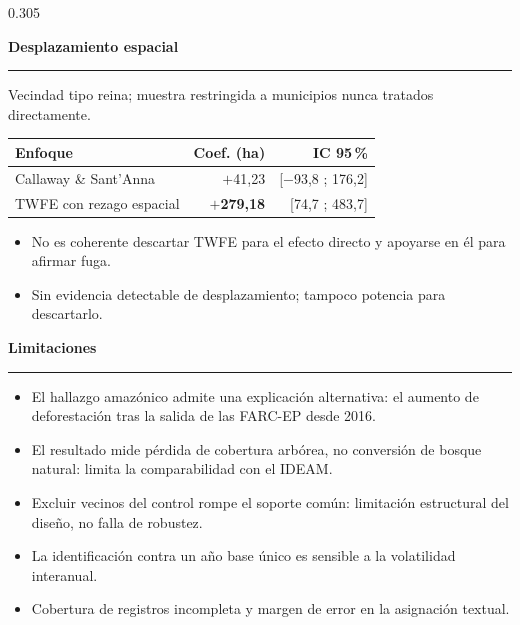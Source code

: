\documentclass[final,t]{beamer}
\newcommand{\seccion}[2]{%
  \par\vspace{0.5\baselineskip}%
  {\color{dosel}\Large\bfseries #1\hfill{\color{tenue}\normalsize\mdseries #2}}\par
  \vspace{-0.35\baselineskip}%
  {\color{dosel}\rule{\linewidth}{2.2pt}}\par
  \vspace{0.25\baselineskip}%
}
\newcommand{\nota}[1]{{\color{tenue}\small #1\par}}
\begin{document}
\begin{frame}[t]{}
\begin{columns}[t]
\begin{column}{0.305\paperwidth}
\seccion{Desplazamiento espacial}{}
\nota{Vecindad tipo reina; muestra restringida a municipios nunca tratados directamente.}
\begin{center}
\begin{tabularx}{\linewidth}{Xrr}
\toprule
\rowcolor{dosel}
\textcolor{papel}{\textbf{Enfoque}} & \textcolor{papel}{\textbf{Coef. (ha)}} &
\textcolor{papel}{\textbf{IC 95\,\%}}\\
\midrule
Callaway  \& Sant'Anna       & $+$41,23 & [$-$93,8 ; 176,2]\\
TWFE con rezago espacial  & \textcolor{brasa}{\textbf{$+$279,18}} & [74,7 ; 483,7]\\
\bottomrule
\end{tabularx}
\end{center}
\begin{itemize}
  \item No es coherente descartar TWFE para el efecto directo y apoyarse en él para afirmar fuga.
  \item Sin evidencia detectable de desplazamiento; tampoco potencia para descartarlo.
\end{itemize}

\seccion{Limitaciones}{}
\begin{itemize}
  \item[\textcolor{brasa}{\rule{0.45ex}{0.45ex}}] El hallazgo amazónico admite una explicación
        alternativa: el aumento de deforestación tras la salida de las FARC-EP desde 2016.
  \item[\textcolor{brasa}{\rule{0.45ex}{0.45ex}}] El resultado mide pérdida de cobertura arbórea,
        no conversión de bosque natural: limita la comparabilidad con el IDEAM.
  \item[\textcolor{brasa}{\rule{0.45ex}{0.45ex}}] Excluir vecinos del control rompe el soporte
        común: limitación estructural del diseño, no falla de robustez.
  \item[\textcolor{brasa}{\rule{0.45ex}{0.45ex}}] La identificación contra un año base único es
        sensible a la volatilidad interanual.
  \item[\textcolor{brasa}{\rule{0.45ex}{0.45ex}}] Cobertura de registros incompleta y margen de
        error en la asignación textual.
\end{itemize}


\end{column}
\end{columns}
\end{frame}
\end{document}
